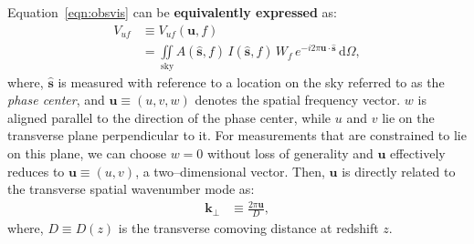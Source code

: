 \documentclass[preprint2,iop,numberedappendix]{emulateapj}
\newcommand{\dif}{\mathrm{d}}
\begin{document}
Equation~\ref{eqn:obsvis} can be {\bf equivalently expressed} as:
\begin{align}\label{eqn:vis}
  V_{uf} &\equiv V_{uf}(\boldsymbol{u},f) \nonumber\\
  &= \iint\limits_\textrm{sky} A(\hat{\boldsymbol{s}},f)\,I(\hat{\boldsymbol{s}},f)\,W_f\,e^{-i2\pi\boldsymbol{u}\cdot\hat{\boldsymbol{s}}}\,\dif\Omega,
\end{align}
where, $\hat{\boldsymbol{s}}$ is measured with reference to a location on the sky referred to as the {\it phase center}, and $\boldsymbol{u}\equiv (u,v,w)$ denotes the spatial frequency vector. $w$ is aligned parallel to the direction of the phase center, while $u$ and $v$ lie on the transverse plane perpendicular to it. For measurements that are constrained to lie on this plane, we can choose $w=0$ without loss of generality and $\boldsymbol{u}$ effectively reduces to $\boldsymbol{u}\equiv (u,v)$, a two--dimensional vector. Then, $\boldsymbol{u}$ is directly related to the transverse spatial wavenumber mode as: 
\begin{align}\label{eqn:k-perp}
  \boldsymbol{k}_\perp &\equiv \frac{2\pi\boldsymbol{u}}{D}, 
\end{align}
where, $D\equiv D(z)$ is the transverse comoving distance at redshift $z$. 
\end{document}
